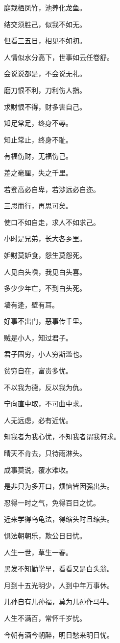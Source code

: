 \documentclass[12pt,oneside]{book}
\begin{document}
庭栽栖凤竹，池养化龙鱼。

结交须胜己，似我不如无。

但看三五日，相见不如初。

人情似水分高下，世事如云任卷舒。

会说说都是，不会说无礼。

磨刀恨不利，刀利伤人指。

求财恨不得，财多害自己。

知足常足，终身不辱。

知止常止，终身不耻。

有福伤财，无福伤己。

差之毫厘，失之千里。

若登高必自卑，若涉远必自迩。

三思而行，再思可矣。

使口不如自走，求人不如求己。

小时是兄弟，长大各乡里。

妒财莫妒食，怨生莫怨死。

人见白头嗔，我见白头喜。

多少少年亡，不到白头死。

墙有逢，壁有耳。

好事不出门，恶事传千里。

贼是小人，知过君子。

君子固穷，小人穷斯滥也。

贫穷自在，富贵多忧。

不以我为德，反以我为仇。

宁向直中取，不可曲中求。

人无远虑，必有近忧。

知我者为我心忧，不知我者谓我何求。

晴天不肯去，只待雨淋头。

成事莫说，覆水难收。

是非只为多开口，烦恼皆因强出头。

忍得一时之气，免得百日之忧。

近来学得乌龟法，得缩头时且缩头。

惧法朝朝乐，欺公日日忧。

人生一世，草生一春。

黑发不知勤学早，看看又是白头翁。

月到十五光明少，人到中年万事休。

儿孙自有儿孙福，莫为儿孙作马牛。

人生不满百，常怀千岁忧。

今朝有酒今朝醉，明日愁来明日忧。
\end{document}
